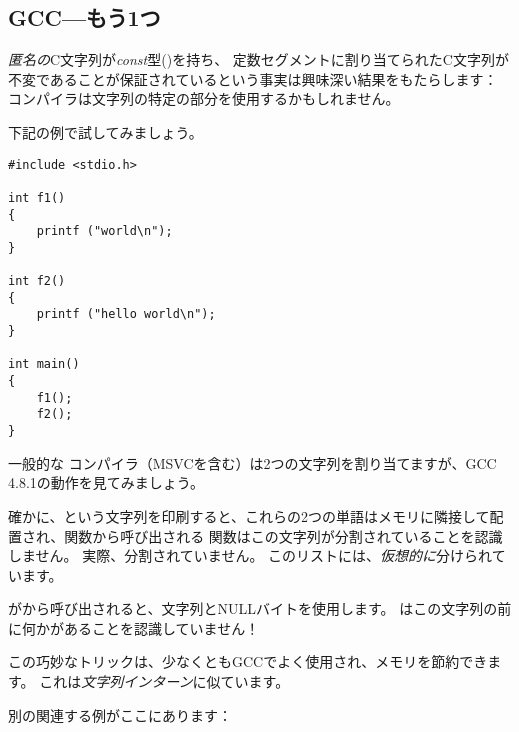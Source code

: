 \subsection{GCC---もう1つ}
\label{use_parts_of_C_strings}

\emph{匿名の}C文字列が\emph{const}型()を持ち、
定数セグメントに割り当てられたC文字列が不変であることが保証されているという事実は興味深い結果をもたらします：
コンパイラは文字列の特定の部分を使用するかもしれません。

下記の例で試してみましょう。

\begin{lstlisting}[style=customc]
#include <stdio.h>

int f1()
{
	printf ("world\n");
}

int f2()
{
	printf ("hello world\n");
}

int main()
{
	f1();
	f2();
}
\end{lstlisting}

一般的な \CCpp{} コンパイラ（MSVCを含む）は2つの文字列を割り当てますが、GCC 4.8.1の動作を見てみましょう。



確かに、という文字列を印刷すると、これらの2つの単語はメモリに隣接して配置され、関数から呼び出される \puts 関数はこの文字列が分割されていることを認識しません。 
実際、分割されていません。 このリストには、\emph{仮想的に}分けられています。

\puts がから呼び出されると、文字列とNULLバイトを使用します。 \puts はこの文字列の前に何かがあることを認識していません！

この巧妙なトリックは、少なくともGCCでよく使用され、メモリを節約できます。 これは\emph{文字列インターン}に似ています。

別の関連する例がここにあります：
